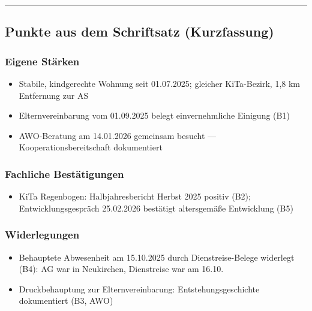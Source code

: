 \documentclass[
  11pt,
  a4paper,
]{article}
\providecommand{\tightlist}{%
  \setlength{\itemsep}{0pt}\setlength{\parskip}{0pt}}
\begin{document}
\begin{center}\rule{0.5\linewidth}{0.5pt}\end{center}

\subsection{Punkte aus dem Schriftsatz
(Kurzfassung)}\label{punkte-aus-dem-schriftsatz-kurzfassung}

\subsubsection{Eigene Stärken}\label{eigene-stuxe4rken}

\begin{itemize}
\tightlist
\item
  Stabile, kindgerechte Wohnung seit 01.07.2025; gleicher KiTa-Bezirk,
  1,8 km Entfernung zur AS
\item
  Elternvereinbarung vom 01.09.2025 belegt einvernehmliche Einigung (B1)
\item
  AWO-Beratung am 14.01.2026 gemeinsam besucht ---
  Kooperationsbereitschaft dokumentiert
\end{itemize}

\subsubsection{Fachliche
Bestätigungen}\label{fachliche-bestuxe4tigungen}

\begin{itemize}
\tightlist
\item
  KiTa Regenbogen: Halbjahresbericht Herbst 2025 positiv (B2);
  Entwicklungsgespräch 25.02.2026 bestätigt altersgemäße Entwicklung
  (B5)
\end{itemize}

\subsubsection{Widerlegungen}\label{widerlegungen}

\begin{itemize}
\tightlist
\item
  Behauptete Abwesenheit am 15.10.2025 durch Dienstreise-Belege
  widerlegt (B4): AG war in Neukirchen, Dienstreise war am 16.10.
\item
  Druckbehauptung zur Elternvereinbarung: Entstehungsgeschichte
  dokumentiert (B3, AWO)
\end{itemize}
\end{document}
